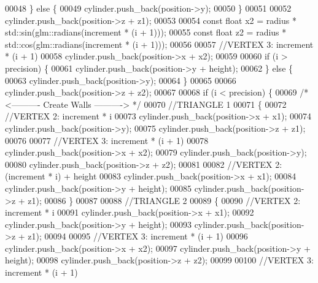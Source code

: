 \begin{DoxyCode}
00048         \} \textcolor{keywordflow}{else} \{
00049             cylinder.push\_back(position->y);
00050         \}
00051 
00052         cylinder.push\_back(position->z + z1);
00053 
00054         \textcolor{keyword}{const} \textcolor{keywordtype}{float} x2 = radius * std::sin(glm::radians(increment * (i + 1)));
00055         \textcolor{keyword}{const} \textcolor{keywordtype}{float} z2 = radius * std::cos(glm::radians(increment * (i + 1)));
00056 
00057         \textcolor{comment}{//VERTEX 3: increment * (i + 1)}
00058         cylinder.push\_back(position->x + x2);
00059         
00060         \textcolor{keywordflow}{if} (i > precision) \{
00061             cylinder.push\_back(position->y + height);
00062         \} \textcolor{keywordflow}{else} \{
00063             cylinder.push\_back(position->y);
00064         \}
00065         
00066         cylinder.push\_back(position->z + z2);
00067 
00068         \textcolor{keywordflow}{if} (i < precision) \{
00069             \textcolor{comment}{/* <---------- Create Walls ----------> */}
00070             \textcolor{comment}{//TRIANGLE 1}
00071             \{
00072                 \textcolor{comment}{//VERTEX 2: increment * i}
00073                 cylinder.push\_back(position->x + x1);
00074                 cylinder.push\_back(position->y);
00075                 cylinder.push\_back(position->z + z1);
00076 
00077                 \textcolor{comment}{//VERTEX 3: increment * (i + 1)}
00078                 cylinder.push\_back(position->x + x2);
00079                 cylinder.push\_back(position->y);
00080                 cylinder.push\_back(position->z + z2);
00081 
00082                 \textcolor{comment}{//VERTEX 2: (increment * i) + height}
00083                 cylinder.push\_back(position->x + x1);
00084                 cylinder.push\_back(position->y + height);
00085                 cylinder.push\_back(position->z + z1);
00086             \}
00087 
00088             \textcolor{comment}{//TRIANGLE 2}
00089             \{
00090                 \textcolor{comment}{//VERTEX 2: increment * i}
00091                 cylinder.push\_back(position->x + x1);
00092                 cylinder.push\_back(position->y + height);
00093                 cylinder.push\_back(position->z + z1);
00094 
00095                 \textcolor{comment}{//VERTEX 3: increment * (i + 1)}
00096                 cylinder.push\_back(position->x + x2);
00097                 cylinder.push\_back(position->y + height);
00098                 cylinder.push\_back(position->z + z2);
00099 
00100                 \textcolor{comment}{//VERTEX 3: increment * (i + 1)}

\end{DoxyCode}
